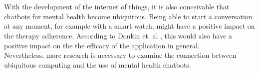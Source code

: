 \documentclass[sigconf, nonacm]{acmart}
\begin{document}
\\\\
With the development of the internet of things, it is also conceivable that chatbots for mental health become ubiquitous. Being able to start a conversation at any moment, for example with a smart watch, might have a positive impact on the therapy adherence. According to Donkin et. al \cite{Donkin2011}, this would also have a positive impact on the the efficacy of the application in general.
\\
Nevertheless, more research is necessary to examine the connection between ubiquitous computing and the use of mental health chatbots.



\appendix
\end{document}
